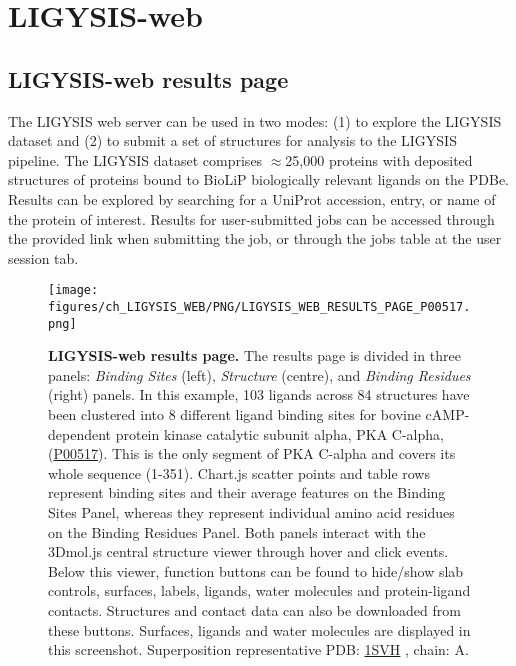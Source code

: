 \section{LIGYSIS-web}

\subsection{LIGYSIS-web results page}

The LIGYSIS web server can be used in two modes: (1) to explore the LIGYSIS dataset and (2) to submit a set of structures for analysis to the LIGYSIS pipeline. The LIGYSIS dataset comprises $\approx$25,000 proteins with deposited structures of proteins bound to BioLiP biologically relevant ligands on the PDBe. Results can be explored by searching for a UniProt accession, entry, or name of the protein of interest. Results for user-submitted jobs can be accessed through the provided link when submitting the job, or through the jobs table at the user session tab.

\begin{figure}[htb!]
    \centering
    \texttt{[image: figures/ch\_LIGYSIS\_WEB/PNG/LIGYSIS\_WEB\_RESULTS\_PAGE\_P00517.png]}
    \caption[LIGYSIS-web results page]{\textbf{LIGYSIS-web results page.} The results page is divided in three panels: \textit{Binding Sites} (left), \textit{Structure} (centre), and \textit{Binding Residues} (right) panels. In this example, 103 ligands across 84 structures have been clustered into 8 different ligand binding sites for bovine cAMP-dependent protein kinase catalytic subunit alpha, PKA C-alpha, (\href{https://www.uniprot.org/uniprotkb/P00517/entry}{P00517}). This is the only segment of PKA C-alpha and covers its whole sequence (1-351). Chart.js scatter points and table rows represent binding sites and their average features on the Binding Sites Panel, whereas they represent individual amino acid residues on the Binding Residues Panel. Both panels interact with the 3Dmol.js central structure viewer through hover and click events. Below this viewer, function buttons can be found to hide/show slab controls, surfaces, labels, ligands, water molecules and protein-ligand contacts. Structures and contact data can also be downloaded from these buttons. Surfaces, ligands and water molecules are displayed in this screenshot. Superposition representative PDB: \href{https://www.ebi.ac.uk/pdbe/entry/pdb/1svh}{1SVH} \cite{BREITENLECHNER_2004_PKB}, chain: A.}
    \label{fig:LIGYSIS_web_results_page}
\end{figure}

